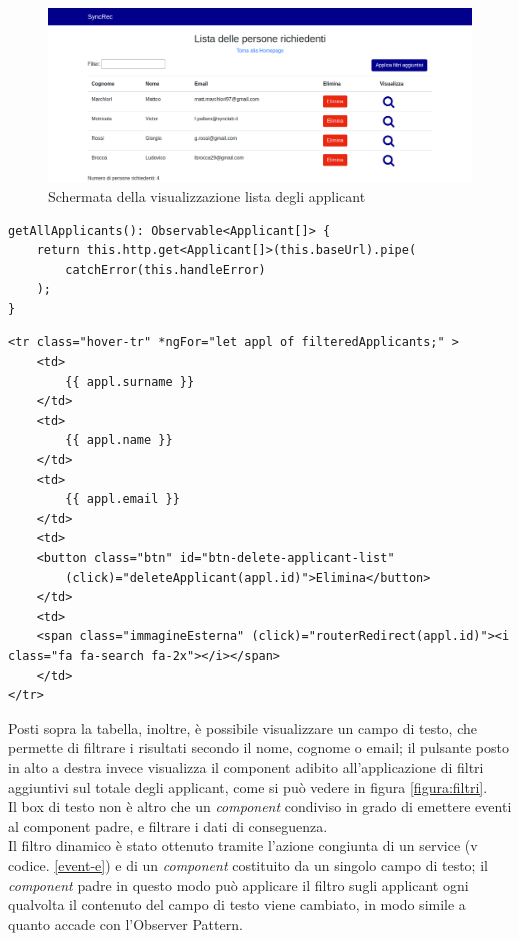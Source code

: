 \vspace{0.5em}
\begin{figure}[!h] 
	\centering 
	\includegraphics[width=1\columnwidth]{immagini/svil/lista} 
	\caption{Schermata della visualizzazione lista degli applicant}
	\label{figura:lista}
\end{figure}

\begin{lstlisting}[label=get-applicant,caption=Funzione del service che effettua la chiamata GET]
getAllApplicants(): Observable<Applicant[]> {
	return this.http.get<Applicant[]>(this.baseUrl).pipe(
		catchError(this.handleError)
	);
}
\end{lstlisting} 

\begin{lstlisting}[label=ng-for,caption=Visualizzazione degli applicant nel codice HTML]
<tr class="hover-tr" *ngFor="let appl of filteredApplicants;" >
	<td>
		{{ appl.surname }}
	</td>
	<td>
		{{ appl.name }}
	</td>
	<td>
		{{ appl.email }}
	</td>
	<td>
	<button class="btn" id="btn-delete-applicant-list"
		(click)="deleteApplicant(appl.id)">Elimina</button>
	</td>
	<td>
	<span class="immagineEsterna" (click)="routerRedirect(appl.id)"><i class="fa fa-search fa-2x"></i></span>
	</td>
</tr>
\end{lstlisting} 

Posti sopra la tabella, inoltre, è possibile visualizzare un campo di testo, che permette di filtrare i risultati secondo il nome, cognome o email; il pulsante posto in alto a destra invece visualizza il component adibito all'applicazione di filtri aggiuntivi sul totale degli applicant, come si può vedere in figura \ref{figura:filtri}.\\
Il box di testo non è altro che un \textit{component} condiviso in grado di emettere eventi al component padre, e filtrare i dati di conseguenza.\\
Il filtro dinamico è stato ottenuto tramite l'azione congiunta di un service (v codice. \ref{event-e}) e di un \textit{component} costituito da un singolo campo di testo; il \textit{component} padre in questo modo può applicare il filtro sugli applicant ogni qualvolta il contenuto del campo di testo viene cambiato, in modo simile a quanto accade con l'\gls{Observer Pattern}.


